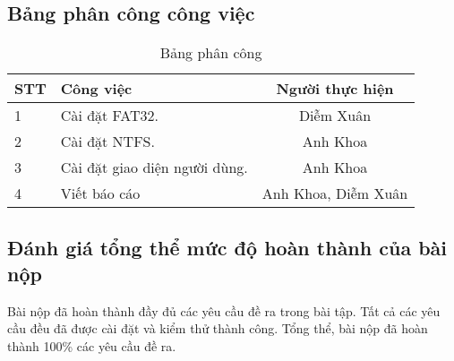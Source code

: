 \subsection{Bảng phân công công việc}
\begin{center}
  \begin{table}[H]
    \centering
    \caption{Bảng phân công }
    \renewcommand{\arraystretch}{1.4}
    \begin{tabular}{|l|p{}|c|}
      \hline
      \textbf{STT} & \textbf{Công việc}            & \textbf{Người thực hiện} \\ \hline
      1            & Cài đặt FAT32.                & Diễm Xuân                \\ \hline
      2            & Cài đặt NTFS.
                   & Anh Khoa                                                 \\ \hline
      3            & Cài đặt giao diện người dùng.
                   & Anh Khoa                                                 \\ \hline
      4            & Viết báo cáo
                   & Anh Khoa, Diễm Xuân                                      \\ \hline
    \end{tabular}
    \label{tab:mytable}
  \end{table}
\end{center}




\subsection{Đánh giá tổng thể mức độ hoàn thành của bài nộp}

Bài nộp đã hoàn thành đầy đủ các yêu cầu đề ra trong bài tập. Tất cả các yêu cầu đều đã được cài đặt và kiểm thử thành công. Tổng thể, bài nộp đã hoàn thành 100\% các yêu cầu đề ra.
